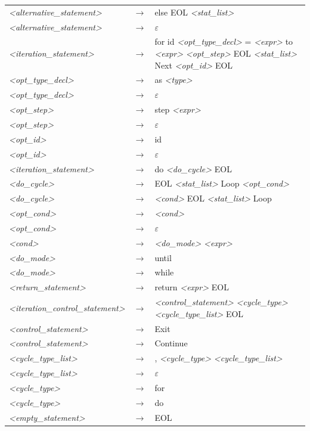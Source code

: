 \documentclass[a4paper, 11pt]{article}
\begin{document}
\begin{table}[H]
\begin{tabular}[l]{l l p{10cm}}
\textit{<alternative\_statement>} & $\rightarrow$ & else EOL \textit{<stat\_list>} \\
\textit{<alternative\_statement>} & $\rightarrow$ & $\varepsilon$ \\
\textit{<iteration\_statement>} & $\rightarrow$ & for id \textit{<opt\_type\_decl>} = \textit{<expr>} to \textit{<expr>} \textit{<opt\_step>} EOL \textit{<stat\_list>} Next \textit{<opt\_id>} EOL \\
\textit{<opt\_type\_decl>} & $\rightarrow$ & as \textit{<type>} \\
\textit{<opt\_type\_decl>} & $\rightarrow$ & $\varepsilon$ \\
\textit{<opt\_step>} & $\rightarrow$ & step \textit{<expr>} \\
\textit{<opt\_step>} & $\rightarrow$ & $\varepsilon$ \\ 
\textit{<opt\_id>} & $\rightarrow$ & id \\
\textit{<opt\_id>} & $\rightarrow$ & $\varepsilon$ \\
\textit{<iteration\_statement>} & $\rightarrow$ & do \textit{<do\_cycle>} EOL \\
\textit{<do\_cycle>} & $\rightarrow$ & EOL \textit{<stat\_list>} Loop \textit{<opt\_cond>} \\
\textit{<do\_cycle>} & $\rightarrow$ & \textit{<cond>} EOL \textit{<stat\_list>} Loop \\
\textit{<opt\_cond>} & $\rightarrow$ & \textit{<cond>} \\
\textit{<opt\_cond>} & $\rightarrow$ & $\varepsilon$ \\
\textit{<cond>} & $\rightarrow$ & \textit{<do\_mode>} \textit{<expr>} \\
\textit{<do\_mode>} & $\rightarrow$ & until \\
\textit{<do\_mode>} & $\rightarrow$ & while \\
\textit{<return\_statement>} & $\rightarrow$ & return \textit{<expr>} EOL \\
\textit{<iteration\_control\_statement>} & $\rightarrow$ & \textit{<control\_statement>} \textit{<cycle\_type>} \textit{<cycle\_type\_list>} EOL \\
\textit{<control\_statement>} & $\rightarrow$ & Exit \\
\textit{<control\_statement>} & $\rightarrow$ & Continue \\
\textit{<cycle\_type\_list>} & $\rightarrow$ & , \textit{<cycle\_type>} \textit{<cycle\_type\_list>} \\
\textit{<cycle\_type\_list>} & $\rightarrow$ & $\varepsilon$ \\
\textit{<cycle\_type>} & $\rightarrow$ & for \\
\textit{<cycle\_type>} & $\rightarrow$ & do \\
\textit{<empty\_statement>} & $\rightarrow$ & EOL \\
\end{tabular}
\end{table}
\end{document}
